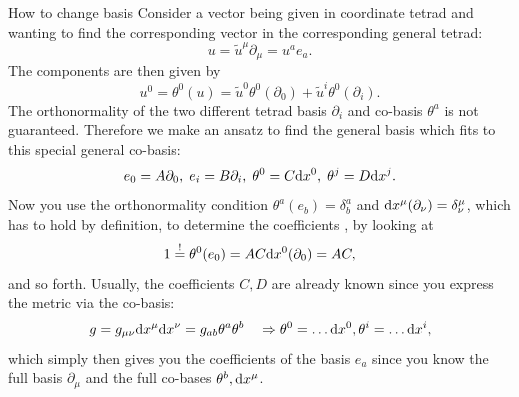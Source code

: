 \begin{mybox}{How to change basis}
	Consider a vector being given in coordinate tetrad and wanting to find the corresponding vector in the corresponding general tetrad:
	\begin{equation}
		u=\tilde{u}^\mu \partial_\mu = u^a e_a.
	\end{equation}
	The components are then given by
	\begin{equation}
		u^0 = \theta^0(u) = \tilde{u}^0 \theta^0(\partial_0) + \tilde{u}^i \theta^0(\partial_i).
	\end{equation}
	The orthonormality of the two different tetrad basis $\partial_i$ and co-basis $\theta^a$ is not guaranteed. Therefore we make an ansatz to find the general basis which fits to this special general co-basis:
	\begin{equation}
		e_0 = A \partial_0, \; e_i = B \partial_i, \; \theta^0 = C\mathrm{d} x^0 ,\; \theta^j = D \mathrm{d} x^j.
	\end{equation}
	Now you use the orthonormality condition $\theta^a(e_b) = \delta^a_b$ and $\mathrm{d} x^\mu(\partial_\nu) = \delta^\mu_\nu$, which has to hold by definition, to determine the coefficients , by looking at 
	\begin{equation}
		1 \stackrel{!}{=} \theta^0(e_0) = AC \mathrm{d} x^0(\partial_0) = AC,
	\end{equation}
	and so forth. Usually, the coefficients $C,D$ are already known since you express the metric via the co-basis:
	\begin{equation}
		g=g_{\mu \nu} \mathrm{d} x^\mu \mathrm{d} x^\nu = g_{ab} \theta^a \theta^b \quad \Rightarrow \theta^0 = \dots \mathrm{d} x^0, \theta^i = \dots \mathrm{d} x^i,
	\end{equation}
	which simply then gives you the coefficients of the basis $e_a$ since you know the full basis $\partial_\mu$ and the full co-bases $\theta^b,\mathrm{d} x^\mu$.
\end{mybox}
